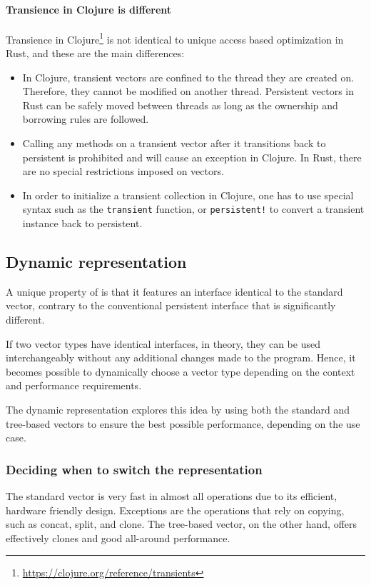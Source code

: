 \paragraph{Transience in Clojure is different}
Transience in Clojure\footnote{\url{https://clojure.org/reference/transients}} is not identical to unique access based optimization in Rust, and these are the main differences:

\begin{itemize}
    \item In Clojure, transient vectors are confined to the thread they are created on. Therefore, they cannot be modified on another thread. Persistent vectors in Rust can be safely moved between threads as long as the ownership and borrowing rules are followed.
    \item Calling any methods on a transient vector after it transitions back to persistent is prohibited and will cause an exception in Clojure. In Rust, there are no special restrictions imposed on vectors.
    \item In order to initialize a transient collection in Clojure, one has to use special syntax such as the \texttt{transient} function, or \texttt{persistent!} to convert a transient instance back to persistent.
\end{itemize}

\subsection{Dynamic representation}
A unique property of \pvec{} is that it features an interface identical to the standard vector, contrary to the conventional persistent interface that is significantly different.

If two vector types have identical interfaces, in theory, they can be used interchangeably without any additional changes made to the program. Hence, it becomes possible to dynamically choose a vector type depending on the context and performance requirements.

The dynamic representation explores this idea by using both the standard and tree-based vectors to ensure the best possible performance, depending on the use case.

\subsubsection*{Deciding when to switch the representation}
The standard vector is very fast in almost all operations due to its efficient, hardware friendly design. Exceptions are the operations that rely on copying, such as concat, split, and clone. The tree-based vector, on the other hand, offers effectively  clones and good all-around performance.

